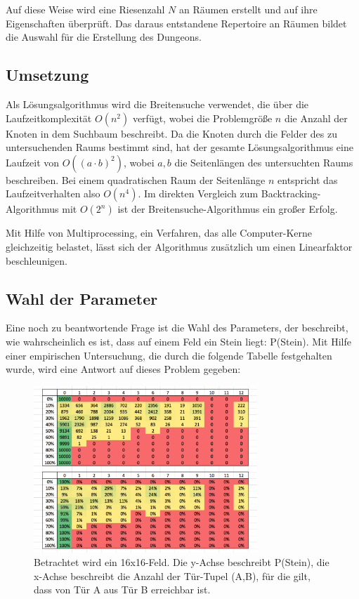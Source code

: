\documentclass[a4paper,10pt,ngerman]{scrartcl}
\begin{document}
			Auf diese Weise wird eine Riesenzahl \(N\) an Räumen erstellt und auf ihre Eigenschaften überprüft. Das daraus entstandene Repertoire an Räumen bildet die Auswahl für die Erstellung des Dungeons.


		\subsection{Umsetzung}

			Als Lösungsalgorithmus wird die Breitensuche verwendet, die über die Laufzeitkomplexität \(O(n^2)\) verfügt, wobei die Problemgröße \(n\) die Anzahl der Knoten in dem Suchbaum beschreibt. Da die Knoten durch die Felder des zu untersuchenden Raums bestimmt sind, hat der gesamte Lösungsalgorithmus eine Laufzeit von \( O( (a \cdot b)^2 ) \), wobei \(a,b\) die Seitenlängen des untersuchten Raums beschreiben. Bei einem quadratischen Raum der Seitenlänge \(n\) entspricht das Laufzeitverhalten also \( O(n^4) \). Im direkten Vergleich zum Backtracking-Algorithmus mit \( O(2^n) \) ist der Breitensuche-Algorithmus ein großer Erfolg.
			
			Mit Hilfe von Multiprocessing, ein Verfahren, das alle Computer-Kerne gleichzeitig belastet, lässt sich der Algorithmus zusätzlich um einen Linearfaktor beschleunigen.
			
		
		\subsection{Wahl der Parameter}

			Eine noch zu beantwortende Frage ist die Wahl des Parameters, der beschreibt, wie wahrscheinlich es ist, dass auf einem Feld ein Stein liegt: P(Stein). Mit Hilfe einer empirischen Untersuchung, die durch die folgende Tabelle festgehalten wurde, wird eine Antwort auf dieses Problem gegeben:
			
			\begin{figure}[h!]
				\begin{center}
					\includegraphics[width=0.75\textwidth]{pStein1.png}
					\caption{Betrachtet wird ein 16x16-Feld. Die y-Achse beschreibt P(Stein), die x-Achse beschreibt die Anzahl der Tür-Tupel (A,B), für die gilt, dass von Tür A aus Tür B erreichbar ist.}
				\end{center}
			\end{figure}
		
\end{document}
